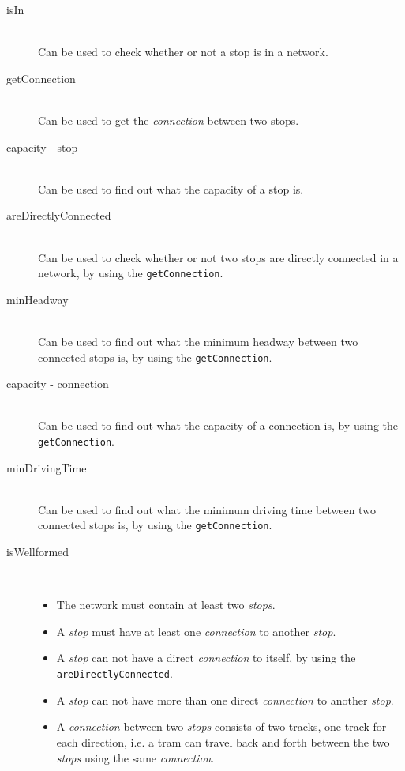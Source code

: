 \documentclass[a4]{article}
\begin{document}
\begin{description}
    \item[isIn] \hfill \\ Can be used to check whether or not a stop is in a network.
    \item[getConnection] \hfill \\ Can be used to get the \emph{connection} between two stops.
    \item[capacity - stop] \hfill \\ Can be used to find out what the capacity of a stop is.
    \item[areDirectlyConnected] \hfill \\ Can be used to check whether or not two stops are directly connected in a network, by using the \verb=getConnection=.
    \item[minHeadway] \hfill \\ Can be used to find out what the minimum headway between two connected stops is, by using the \verb=getConnection=.
    \item[capacity - connection] \hfill \\ Can be used to find out what the capacity of a connection is, by using the \verb=getConnection=.
    \item[minDrivingTime] \hfill \\ Can be used to find out what the minimum driving time between two connected stops is, by using the \verb=getConnection=.
    \item[isWellformed] \hfill \\ 
        \begin{itemize}
            \item The network must contain at least two \emph{stops}.
            \item A \emph{stop} must have at least one \emph{connection} to another \emph{stop}.
            \item A \emph{stop} can not have a direct \emph{connection} to itself, by using the \verb=areDirectlyConnected=.
            \item A \emph{stop} can not have more than one direct \emph{connection} to another \emph{stop}.
            \item A \emph{connection} between two \emph{stops} consists of two tracks, one track for each direction, i.e. a tram can travel back and forth between the two \emph{stops} using the same \emph{connection}.

\end{itemize}
\end{description}
\end{document}
